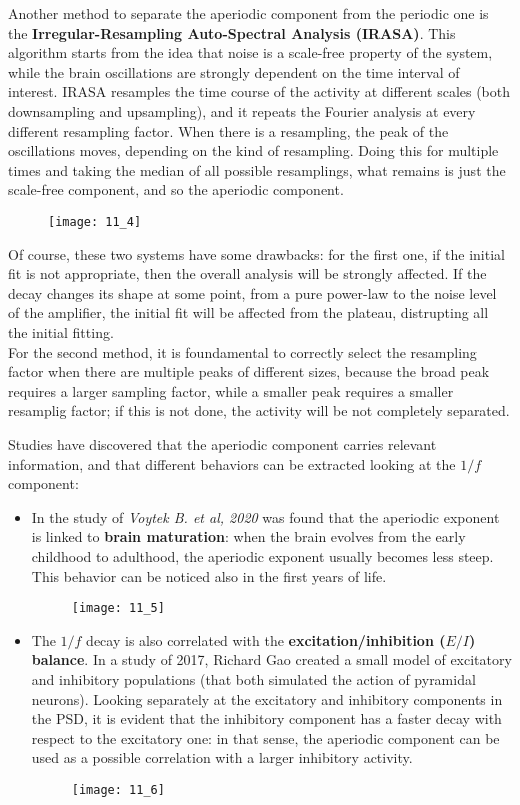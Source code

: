 \par\medskip
Another method to separate the aperiodic component from the periodic one is the \textbf{Irregular-Resampling Auto-Spectral Analysis (IRASA)}. This algorithm starts from the idea 
that noise is a scale-free property of the system, while the brain oscillations are strongly dependent on the time interval of interest. IRASA resamples the time course of the activity 
at different scales (both downsampling and upsampling), and it repeats the Fourier analysis at every different resampling factor. When there is a resampling, the peak of the oscillations 
moves, depending on the kind of resampling. Doing this for multiple times and taking the median of all possible resamplings, what remains is just the scale-free component, and so the aperiodic 
component.
\begin{figure}[H]
    \texttt{[image: 11\_4]}
    \centering
\end{figure}
Of course, these two systems have some drawbacks: for the first one, if the initial fit is not appropriate, then the overall analysis will be strongly affected. If the decay changes its shape at 
some point, from a pure power-law to the noise level of the amplifier, the initial fit will be affected from the plateau, distrupting all the initial fitting.\\
For the second method, it is foundamental to correctly select the resampling factor when there are multiple peaks of different sizes, because the broad peak requires a larger sampling factor, while 
a smaller peak requires a smaller resamplig factor; if this is not done, the activity will be not completely separated.
\par\medskip
Studies have discovered that the aperiodic component carries relevant information, and that different behaviors can be extracted looking at the \(1/f\) component:
\begin{itemize}
\item In the study of \textit{Voytek B. et al, 2020} was found that the aperiodic exponent is linked to \textbf{brain maturation}: when the brain evolves from the early childhood 
to adulthood, the aperiodic exponent usually becomes less steep. This behavior can be noticed also in the first years of life.
\begin{figure}[H]
    \texttt{[image: 11\_5]}
    \centering
\end{figure}
\item The \(1/f\) decay is also correlated with the \textbf{excitation/inhibition (\(E/I\)) balance}. In a study of 2017, Richard Gao created a small model 
of excitatory and inhibitory populations (that both simulated the action of pyramidal neurons). Looking separately at the excitatory and inhibitory components in 
the PSD, it is evident that the inhibitory component has a faster decay with respect to the excitatory one: in that sense, the aperiodic component can be used as a possible
correlation with a larger inhibitory activity.
\begin{figure}[H]
    \texttt{[image: 11\_6]}
    \centering
\end{figure}
\end{itemize}
